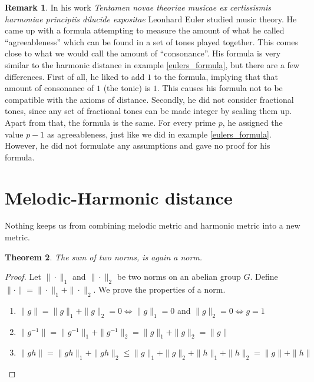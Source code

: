 \documentclass[a4paper]{book}
\newtheorem{theorem}{Theorem}[chapter]
\theoremstyle{definition}
\newtheorem{remark}[theorem]{Remark}
\begin{document}
\begin{remark}
    In his work \emph{Tentamen novae theoriae musicae ex certissismis harmoniae principiis dilucide expositae} Leonhard Euler studied music theory. 
    He came up with a formula attempting to measure the amount of what he called ``agreeableness'' which can be found in a set of tones played together. \cite{Euler}
    This comes close to what we would call the amount of ``consonance''.
    His formula is very similar to the harmonic distance in example \ref{eulers_formula}, but there are a few differences.
    First of all, he liked to add $1$ to the formula, implying that that amount of consonance of $1$ (the tonic) is $1$.
    This causes his formula not to be compatible with the axioms of distance.
    Secondly, he did not consider fractional tones, since any set of fractional tones can be made integer by scaling them up.
    Apart from that, the formula is the same.
    For every prime $p$, he assigned the value $p-1$ as agreeableness, just like we did in example \ref{eulers_formula}.
    However, he did not formulate any assumptions and gave no proof for his formula.
\end{remark}


\section{Melodic-Harmonic distance}
Nothing keeps us from combining melodic metric and harmonic metric into a new metric.

\begin{theorem}
    The sum of two norms, is again a norm.
    \label{sum_of_norms}
\end{theorem}
\begin{proof}
    Let $\|\cdot\|_1$ and $\|\cdot\|_2$ be two norms on an abelian group $G$.
    Define $\|\cdot\| = \|\cdot\|_1 + \|\cdot\|_2$.
    We prove the properties of a norm.
    \begin{enumerate}[i]
        \item $\|g\| = \|g\|_1 + \|g\|_2 = 0 \Leftrightarrow \|g\|_1 = 0 $ and $\|g\|_2 = 0 \Leftrightarrow g = 1$
        \item $\|g^{-1}\| = \|g^{-1}\|_1 + \|g^{-1}\|_2 = \|g\|_1 + \|g\|_2 = \|g\|$
        \item $\|gh\| = \|gh\|_1 + \|gh\|_2 \leq  \|g\|_1 + \|g\|_2 + \|h\|_1 + \|h\|_2 = \|g\| + \|h\|$
    \end{enumerate}
\end{proof}
\end{document}
